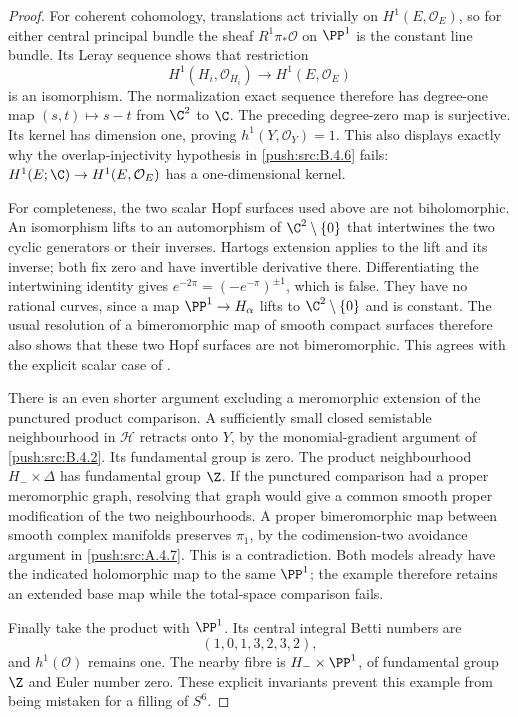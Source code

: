 \begin{proof}
For coherent cohomology, translations act trivially on
$H^1(E,\mathcal O_E)$, so for either central principal bundle
the sheaf $R^1\pi_*\mathcal O$ on $\PP^1$ is the constant
line bundle.  Its Leray sequence shows that restriction
\[
 H^1(H_i,\mathcal O_{H_i})\longrightarrow H^1(E,\mathcal O_E)
\]
is an isomorphism.  The normalization exact sequence therefore
has degree-one map $(s,t)\mapsto s-t$ from $\C^2$ to $\C$.
The preceding degree-zero map is surjective.  Its kernel has
dimension one, proving $h^1(Y,\mathcal O_Y)=1$.
This also displays exactly why the overlap-injectivity hypothesis
in \ref{push:src:B.4.6} fails: $H^1(E;\C)\to H^1(E,\mathcal O_E)$ has a
one-dimensional kernel.

For completeness, the two scalar Hopf surfaces used above are
not biholomorphic.  An isomorphism lifts to an automorphism of
$\C^2\setminus\{0\}$ that intertwines the two cyclic generators
or their inverses.  Hartogs extension applies to the lift and
its inverse; both fix zero and have invertible derivative there.
Differentiating the intertwining identity gives
$e^{-2\pi}=(-e^{-\pi})^{\pm1}$, which is false.  They have
no rational curves, since a map $\PP^1\to H_\alpha$ lifts to
$\C^2\setminus\{0\}$ and is constant.  The usual resolution
of a bimeromorphic map of smooth compact surfaces therefore
also shows that these two Hopf surfaces are not bimeromorphic.
This agrees with the explicit scalar case of
\citet[Section 2.2]{AbashevaDeev2024AB}.

There is an even shorter argument excluding a meromorphic
extension of the punctured product comparison.  A sufficiently
small closed semistable neighbourhood in $\mathcal H$ retracts
onto $Y$, by the monomial-gradient argument of \ref{push:src:B.4.2}.  Its
fundamental group is zero.  The product neighbourhood
$H_-\times\Delta$ has fundamental group $\Z$.  If the
punctured comparison had a proper meromorphic graph, resolving
that graph would give a common smooth proper modification of
the two neighbourhoods.  A proper bimeromorphic map between
smooth complex manifolds preserves $\pi_1$, by the
codimension-two avoidance argument in \ref{push:src:A.4.7}.  This is a
contradiction.  Both models already have the indicated
holomorphic map to the same $\PP^1$; the example therefore
retains an extended base map while the total-space comparison
fails.

Finally take the product with $\PP^1$.  Its central integral
Betti numbers are
\[
 (1,0,1,3,2,3,2),
\]
and $h^1(\mathcal O)$ remains one.  The nearby fibre is
$H_-\times\PP^1$, of fundamental group $\Z$ and Euler
number zero.  These explicit invariants prevent this example
from being mistaken for a filling of $S^6$.
\end{proof}


